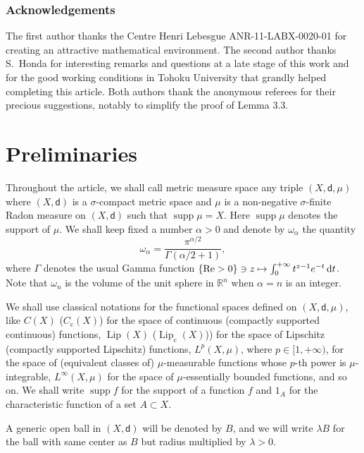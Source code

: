 \documentclass[JEP,XML,SOM,Unicode,published]{cedram}
\newcommand\mto{\mathchoice{\longmapsto}{\mapsto}{\mapsto}{\mapsto}}
\newcommand{\rmc}{\mathrm{c}}
\theoremstyle{plain}
\theoremstyle{definition}
\newcommand{\setR}{\mathbb{R}}
\newcommand{\di}{\mathop{}\!\mathrm{d}}
\DeclareMathOperator{\supp}{supp}
\DeclareMathOperator{\Lip}{Lip}
\newcommand{\dist}{\mathsf{d}}
\begin{document}
\subsubsection*{Acknowledgements}
The first author thanks the Centre Henri Lebesgue ANR-11-LABX-0020-01 for creating an attractive mathematical environment. The second author thanks S.~Honda for interesting remarks and questions at a late stage of this work and for the good working conditions in Tohoku University that grandly helped completing this article. Both authors thank the anonymous referees for their precious suggestions, notably to simplify the proof of Lemma 3.3.

\section{Preliminaries}\label{sec:2}

Throughout the article, we shall call metric measure space any triple $(X,\dist,\mu)$ where $(X,\dist)$ is a $\sigma$-compact metric space and $\mu$ is a non-negative $\sigma$-finite Radon measure on $(X,\dist)$ such that $\supp \mu = X$. Here $\supp \mu$ denotes the support of $\mu$. We shall keep fixed a number $\alpha>0$ and denote by $\omega_\alpha$ the quantity
\begin{equation}\label{eq:omega_n}
\omega_\alpha = \frac{\pi^{\alpha/2}}{\Gamma(\alpha/2+1)},
\end{equation}
where $\Gamma$ denotes the usual Gamma function $\{\mathrm{Re}>0\} \ni z \mto \int_0^{+\infty} t^{z-1}e^{-t} \di t$. Note that $\omega_n$ is the volume of the unit sphere in $\setR^n$ when $\alpha=n$ is an integer.

We shall use classical notations for the functional spaces defined on $(X,\dist, \mu)$, like $C(X)$ (\resp $C_\rmc(X)$) for the space of continuous (\resp compactly supported continuous) functions, $\Lip(X)$ (\resp $\Lip_\rmc(X)$)) for the space of Lipschitz (\resp compactly supported Lipschitz) functions, $L^p(X,\mu)$, where $p \in [1,+\infty)$, for the space of (equivalent classes of) $\mu$-measurable functions whose $p$-th power is $\mu$-integrable, $L^\infty(X,\mu)$ for the space of $\mu$-essentially bounded functions, and so on.
We shall write $\supp f$ for the support of a function $f$ and $1_A$ for the characteristic function of a set $A \subset X$.

A generic open ball in $(X,\dist)$ will be denoted by $B$, and we will write $\lambda B$ for the ball with same center as $B$ but radius multiplied by $\lambda>0$.
\end{document}
